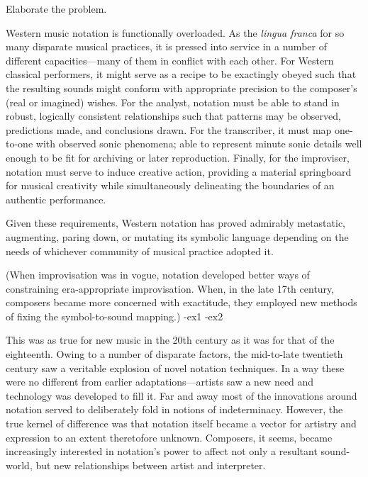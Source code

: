 
\begin{notestuff}
Elaborate the problem.
\end{notestuff}

Western music notation is functionally overloaded.
As the \textit{lingua franca} for so many disparate musical practices, it is pressed into service in a number of different capacities---many of them in conflict with each other.
For Western classical performers, it might serve as a recipe to be exactingly obeyed such that the resulting sounds might conform with appropriate precision to the composer's (real or imagined) wishes.
For the analyst, notation must be able to stand in robust, logically consistent relationships such that patterns may be observed, predictions made, and conclusions drawn.
For the transcriber, it must map one-to-one with observed sonic phenomena; able to represent minute sonic details well enough to be fit for archiving or later reproduction.
Finally, for the improviser, notation must serve to induce creative action, providing a material springboard for musical creativity while simultaneously delineating the boundaries of an authentic performance.

Given these requirements, Western notation has proved admirably metastatic, augmenting, paring down, or mutating its symbolic language depending on the needs of whichever community of musical practice adopted it.

(When improvisation was in vogue, notation developed better ways of constraining era-appropriate improvisation. When, in the late 17th century, composers became more concerned with exactitude, they employed new methods of fixing the symbol-to-sound mapping.)
    -ex1
    -ex2


This was as true for new music in the 20th century as it was for that of the eighteenth. 
Owing to a number of disparate factors, the mid-to-late twentieth century saw a veritable explosion of novel notation techniques.
In a way these were no different from earlier adaptations---artists saw a new need and technology was developed to fill it.
Far and away most of the innovations around notation served to deliberately fold in notions of indeterminacy.
However, the true kernel of difference was that notation itself became a vector for artistry and expression to an extent theretofore unknown.
Composers, it seems, became increasingly interested in notation's power to affect not only a resultant sound-world, but new relationships between artist and interpreter.

